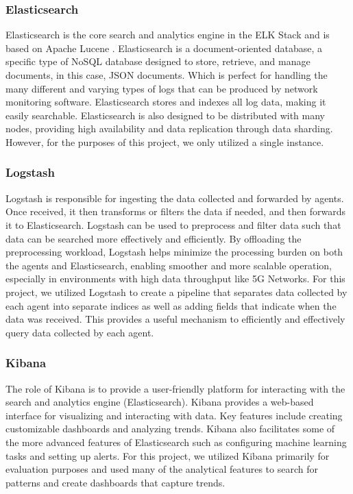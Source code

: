 \documentclass[final,1p,times,authoryear]{elsarticle}
\begin{document}
\subsubsection{Elasticsearch}
\label{sub3sub2sec1}
Elasticsearch is the core search and analytics engine in the ELK Stack and is based on  Apache Lucene \citep{bialecki2012apache}. Elasticsearch is a document-oriented database, a specific type of NoSQL database designed to store, retrieve, and manage documents, in this case, JSON documents. Which is perfect for handling the many different and varying types of logs that can be produced by network monitoring software. Elasticsearch stores and indexes all log data, making it easily searchable. Elasticsearch is also designed to be distributed with many nodes, providing high availability and data replication through data sharding. However, for the purposes of this project, we only utilized a single instance.
\subsubsection{Logstash}
\label{sub3sub2sec2}
Logstash is responsible for ingesting the data collected and forwarded by agents. Once received, it then transforms or filters the data if needed, and then forwards it to  Elasticsearch. Logstash can be used to preprocess and filter data such that data can be searched more effectively and efficiently. By offloading the preprocessing workload, Logstash helps minimize the processing burden on both the agents and Elasticsearch, enabling smoother and more scalable operation, especially in environments with high data throughput like 5G Networks. For this project, we utilized Logstash to create a pipeline that separates data collected by each agent into separate indices as well as adding fields that indicate when the data was received. This provides a useful mechanism to efficiently and effectively query data collected by each agent.
\subsubsection{Kibana}
\label{sub3sub2sec3}
The role of Kibana is to provide a user-friendly platform for interacting with the search and analytics engine (Elasticsearch). Kibana provides a web-based interface for visualizing and interacting with data. Key features include creating customizable dashboards and analyzing trends. Kibana also facilitates some of the more advanced features of Elasticsearch such as configuring machine learning tasks and setting up alerts. For this project, we utilized Kibana primarily for evaluation purposes and used many of the analytical features to search for patterns and create dashboards that capture trends.
\end{document}
